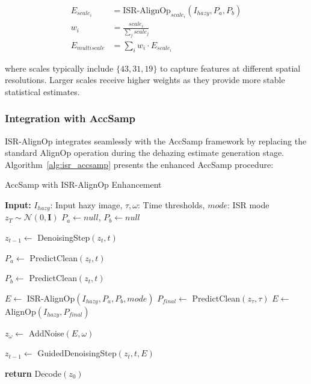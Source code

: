 \documentclass{article}
\begin{document}
\begin{align}
E_{scale_i} &= \text{ISR-AlignOp}_{scale_i}(I_{hazy}, P_a, P_b) \label{eq:multiscale_isr} \\
w_i &= \frac{scale_i}{\sum_{j} scale_j} \label{eq:scale_weight} \\
E_{multiscale} &= \sum_{i} w_i \cdot E_{scale_i} \label{eq:multiscale_fusion}
\end{align}

where scales typically include $\{43, 31, 19\}$ to capture features at different spatial resolutions. Larger scales receive higher weights as they provide more stable statistical estimates.

\subsubsection{Integration with AccSamp}

ISR-AlignOp integrates seamlessly with the AccSamp framework by replacing the standard AlignOp operation during the dehazing estimate generation stage. Algorithm~\ref{alg:isr_accsamp} presents the enhanced AccSamp procedure:

\begin{algorithm}[tb]
\caption{AccSamp with ISR-AlignOp Enhancement}
\label{alg:isr_accsamp}
\begin{algorithmic}[1]
\STATE \textbf{Input:} $I_{hazy}$: Input hazy image, $\tau, \omega$: Time thresholds, $mode$: ISR mode
\STATE $z_T \sim \mathcal{N}(0, \mathbf{I})$
\STATE $P_a \leftarrow null$, $P_b \leftarrow null$

    \STATE $z_{t-1} \leftarrow$ DenoisingStep$(z_t, t)$
    
        \STATE $P_a \leftarrow$ PredictClean$(z_t, t)$
    \ENDIF
    
        \STATE $P_b \leftarrow$ PredictClean$(z_t, t)$
    \ENDIF
\ENDFOR

    \STATE $E \leftarrow$ ISR-AlignOp$(I_{hazy}, P_a, P_b, mode)$
\ELSE
    \STATE $P_{final} \leftarrow$ PredictClean$(z_\tau, \tau)$
    \STATE $E \leftarrow$ AlignOp$(I_{hazy}, P_{final})$ 
\ENDIF

\STATE $z_\omega \leftarrow$ AddNoise$(E, \omega)$

    \STATE $z_{t-1} \leftarrow$ GuidedDenoisingStep$(z_t, t, E)$
\ENDFOR

\STATE \textbf{return} Decode$(z_0)$
\end{algorithmic}
\end{algorithm}
\end{document}
